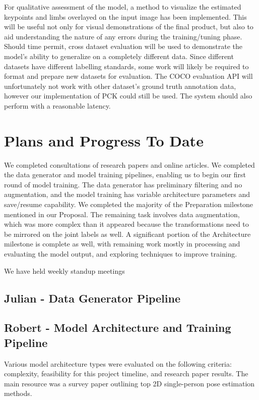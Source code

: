 \documentclass[11pt, letterpaper]{article}
\begin{document}
For qualitative assessment of the model, a method to visualize the estimated keypoints and limbs overlayed on the input image has been implemented. This will be useful not only for visual demonstrations of the final product, but also to aid understanding the nature of any errors during the training/tuning phase. Should time permit, cross dataset evaluation will be used to demonstrate the model’s ability to generalize on a completely different data. Since different datasets have different labelling standards, some work will likely be required to format and prepare new datasets for evaluation. The COCO evaluation API will unfortunately not work with other dataset’s ground truth annotation data, however our implementation of PCK could still be used. The system should also perform with a reasonable latency.


\section{Plans and Progress To Date}

We completed consultations of research papers and online articles. We completed the data generator and model training pipelines, enabling us to begin our first round of model training. The data generator has preliminary filtering and no augmentation, and the model training has variable architecture parameters and save/resume capability. We completed the majority of the Preparation milestone mentioned in our Proposal. The remaining task involves data augmentation, which was more complex than it appeared because the transformations need to be mirrored on the joint labels as well. A significant portion of the Architecture milestone is complete as well, with remaining work mostly in processing and evaluating the model output, and exploring techniques to improve training.

We have held weekly standup meetings 

\subsection{Julian - Data Generator Pipeline}

\subsection{Robert - Model Architecture and Training Pipeline}
Various model architecture types were evaluated on the following criteria: complexity, feasibility for this project timeline, and research paper results. The main resource was a survey paper outlining top 2D single-person pose estimation methods.
\end{document}

